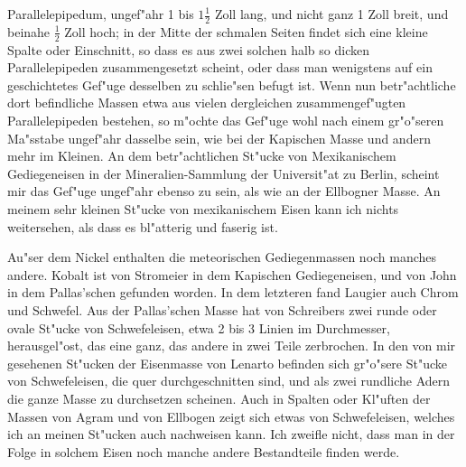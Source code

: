 \documentclass[a4paper, 11pt, oneside, polutonikogreek, german]{article}
\begin{document}
Parallelepipedum, ungef"ahr 1 bis $\mathfrak{1\frac{1}{2}}$ Zoll lang, und nicht ganz 1 Zoll breit, und beinahe $\mathfrak{\frac{1}{2}}$ Zoll hoch; in der Mitte der schmalen Seiten findet sich eine kleine Spalte oder Einschnitt, so dass es aus zwei solchen halb so dicken Parallelepipeden zusammengesetzt scheint, oder dass man wenigstens auf ein geschichtetes Gef"uge desselben zu schlie"sen befugt ist. Wenn nun betr"achtliche dort befindliche Massen etwa aus vielen dergleichen zusammengef"ugten Parallelepipeden bestehen, so m"ochte das Gef"uge wohl nach einem gr"o"seren Ma"sstabe ungef"ahr dasselbe sein, wie bei der Kapischen Masse und andern mehr im Kleinen. An dem betr"achtlichen St"ucke von Mexikanischem Gediegeneisen in der Mineralien-Sammlung der Universit"at zu Berlin, scheint mir das Gef"uge ungef"ahr ebenso zu sein, als wie an der Ellbogner Masse. An meinem sehr kleinen St"ucke von mexikanischem Eisen kann ich nichts weitersehen, als dass es bl"atterig und faserig ist.

Au"ser dem Nickel enthalten die meteorischen Gediegenmassen noch manches andere. Kobalt ist von Stromeier in dem Kapischen Gediegeneisen, und von John in dem Pallas'schen gefunden worden. In dem letzteren fand Laugier auch Chrom und Schwefel. Aus der Pallas'schen Masse hat von Schreibers zwei runde oder ovale St"ucke von Schwefeleisen, etwa 2 bis 3 Linien im Durchmesser, herausgel"ost, das eine ganz, das andere in zwei Teile zerbrochen. In den von mir gesehenen St"ucken der Eisenmasse von Lenarto befinden sich gr"o"sere St"ucke von Schwefeleisen, die quer durchgeschnitten sind, und als zwei rundliche Adern die ganze Masse zu durchsetzen scheinen. Auch in Spalten oder Kl"uften der Massen von Agram und von Ellbogen zeigt sich etwas von Schwefeleisen, welches ich an meinen St"ucken auch nachweisen kann. Ich zweifle nicht, dass man in der Folge in solchem Eisen noch manche andere Bestandteile finden werde.
\end{document}
